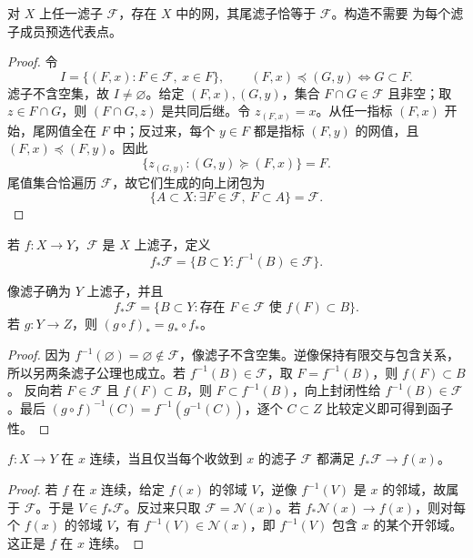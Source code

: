 \begin{theorem}[滤子可由网实现]\label{theorem:1-1-2-2}
对 \(X\) 上任一滤子 \(\mathcal F\)，存在 \(X\) 中的网，其尾滤子恰等于 \(\mathcal F\)。构造不需要
为每个滤子成员预选代表点。
\end{theorem}
\begin{proof}
令
\[
 I=\{(F,x):F\in\mathcal F,\ x\in F\},
 \qquad (F,x)\preceq(G,y)\Longleftrightarrow G\subset F.
\]
滤子不含空集，故 \(I\ne\varnothing\)。给定 \((F,x),(G,y)\)，集合
\(F\cap G\in\mathcal F\) 且非空；取 \(z\in F\cap G\)，则 \((F\cap G,z)\) 是共同后继。令
\(z_{(F,x)}=x\)。从任一指标 \((F,x)\) 开始，尾网值全在 \(F\) 中；反过来，每个 \(y\in F\) 都是指标
\((F,y)\) 的网值，且 \((F,x)\preceq(F,y)\)。因此
\[
  \{z_{(G,y)}:(G,y)\succeq(F,x)\}=F.
\]
尾值集合恰遍历 \(\mathcal F\)，故它们生成的向上闭包为
\[
  \{A\subset X:\exists F\in\mathcal F,\ F\subset A\}=\mathcal F.
\]
\end{proof}

\begin{definition}[像滤子]\label{def:1-1-2-image}
若 \(f:X\to Y\)，\(\mathcal F\) 是 \(X\) 上滤子，定义
\[
 f_*\mathcal F=\{B\subset Y:f^{-1}(B)\in\mathcal F\}.
\]
\end{definition}

\begin{proposition}[像滤子的基本性质]\label{proposition:1-1-2-image-properties}
像滤子确为 \(Y\) 上滤子，并且
\[
 f_*\mathcal F
 =\{B\subset Y:\text{存在 }F\in\mathcal F\text{ 使 }f(F)\subset B\}.
\]
若 \(g:Y\to Z\)，则 \((g\circ f)_*=g_*\circ f_*\)。
\end{proposition}
\begin{proof}
因为 \(f^{-1}(\varnothing)=\varnothing\notin\mathcal F\)，像滤子不含空集。逆像保持有限交与包含关系，
所以另两条滤子公理也成立。若 \(f^{-1}(B)\in\mathcal F\)，取 \(F=f^{-1}(B)\)，则 \(f(F)\subset B\)。
反向若 \(F\in\mathcal F\) 且 \(f(F)\subset B\)，则 \(F\subset f^{-1}(B)\)，向上封闭性给
\(f^{-1}(B)\in\mathcal F\)。最后
\((g\circ f)^{-1}(C)=f^{-1}(g^{-1}(C))\)，逐个 \(C\subset Z\) 比较定义即可得到函子性。
\end{proof}

\begin{proposition}[连续性的滤子判别]\label{proposition:1-1-2-3}
\(f:X\to Y\) 在 \(x\) 连续，当且仅当每个收敛到 \(x\) 的滤子 \(\mathcal F\) 都满足
\(f_*\mathcal F\to f(x)\)。
\end{proposition}
\begin{proof}
若 \(f\) 在 \(x\) 连续，给定 \(f(x)\) 的邻域 \(V\)，逆像 \(f^{-1}(V)\) 是 \(x\) 的邻域，故属于
\(\mathcal F\)。于是 \(V\in f_*\mathcal F\)。反过来只取 \(\mathcal F=\mathcal N(x)\)。若
\(f_*\mathcal N(x)\to f(x)\)，则对每个 \(f(x)\) 的邻域 \(V\)，有
\(f^{-1}(V)\in\mathcal N(x)\)，即 \(f^{-1}(V)\) 包含 \(x\) 的某个开邻域。这正是 \(f\) 在 \(x\)
连续。
\end{proof}


